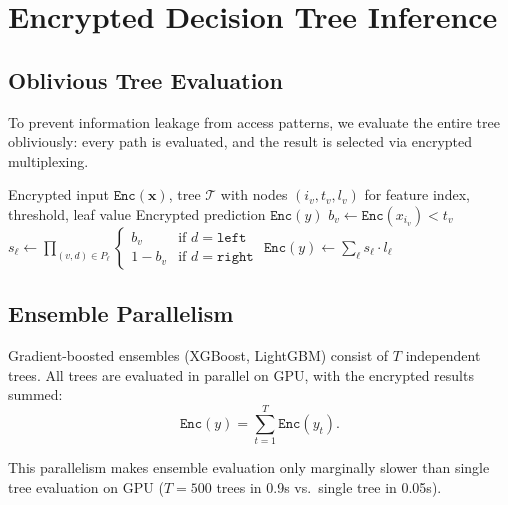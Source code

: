 \section{Encrypted Decision Tree Inference}

\label{sec:tree}

\subsection{Oblivious Tree Evaluation}

To prevent information leakage from access patterns, we evaluate the entire
tree obliviously: every path is evaluated, and the result is selected via
encrypted multiplexing.

\begin{algorithm}
\caption{Oblivious Decision Tree Evaluation}
\label{alg:tree}
\begin{algorithmic}[1]
\Require Encrypted input $\texttt{Enc}(\mathbf{x})$, tree $\mathcal{T}$ with
    nodes $(i_v, t_v, l_v)$ for feature index, threshold, leaf value
\Ensure Encrypted prediction $\texttt{Enc}(y)$
    \State $b_v \leftarrow \texttt{Enc}(x_{i_v}) < t_v$ 
\EndFor
{}
    \State $s_\ell \leftarrow \prod_{(v, d) \in P_\ell}
    \begin{cases} b_v & \text{if } d = \texttt{left} \\
    1 - b_v & \text{if } d = \texttt{right} \end{cases}$
\EndFor
\State $\texttt{Enc}(y) \leftarrow \sum_\ell s_\ell \cdot l_\ell$
\end{algorithmic}
\end{algorithm}

\subsection{Ensemble Parallelism}

Gradient-boosted ensembles (XGBoost, LightGBM) consist of $T$ independent trees.
All trees are evaluated in parallel on GPU, with the encrypted results summed:
\begin{equation}
\texttt{Enc}(y) = \sum_{t=1}^{T} \texttt{Enc}(y_t).
\end{equation}

This parallelism makes ensemble evaluation only marginally slower than single
tree evaluation on GPU ($T = 500$ trees in 0.9s vs.\ single tree in 0.05s).

